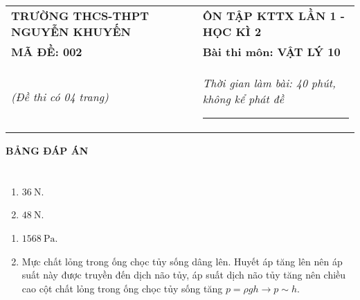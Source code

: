 \begin{center}
	\begin{tabular}{M{9.25cm}M{8.75cm}}
		\textbf{TRƯỜNG THCS-THPT NGUYỄN KHUYẾN}& \textbf{ÔN TẬP KTTX LẦN 1 - HỌC KÌ 2}\\
		\textbf{MÃ ĐỀ: 002}& \textbf{Bài thi môn: VẬT LÝ 10}\\
		\textit{(Đề thi có 04 trang)}& \textit{Thời gian làm bài: 40 phút, không kể phát đề}
		
		\noindent\rule{4cm}{0.8pt} \\
	\end{tabular}
\end{center}
\setcounter{section}{0}
\begin{center}
	\textbf{\large BẢNG ĐÁP ÁN}
\end{center}
\section{}
\section{}
\section{}
\setcounter{ex}{0}
\begin{ex}
	\begin{enumerate}[label=\alph*)]
		\item $\SI{36}{\newton}$.
		\item $\SI{48}{\newton}$.
	\end{enumerate}
	\loigiai{}
\end{ex}
\begin{ex}
	\begin{enumerate}[label=\alph*)]
		\item $\SI{1568}{\pascal}$.
		\item Mực chất lỏng trong ống chọc tủy sống dâng lên. Huyết áp tăng lên nên áp suất này được truyền đến dịch não tủy, áp suất dịch não tủy tăng nên chiều cao cột chất lỏng trong ống chọc tủy sống tăng $p=\rho gh\rightarrow p\sim h$.
	\end{enumerate}
	\loigiai{}
\end{ex}
